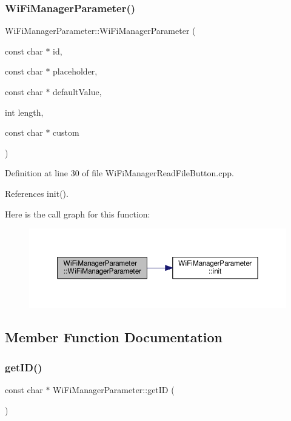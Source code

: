 \subsubsection{\texorpdfstring{Wi\+Fi\+Manager\+Parameter()}{WiFiManagerParameter()}\hspace{0.1cm}{\footnotesize\ttfamily [3/3]}}
{\footnotesize\ttfamily Wi\+Fi\+Manager\+Parameter\+::\+Wi\+Fi\+Manager\+Parameter (\begin{DoxyParamCaption}\item[{const char $\ast$}]{id,  }\item[{const char $\ast$}]{placeholder,  }\item[{const char $\ast$}]{default\+Value,  }\item[{int}]{length,  }\item[{const char $\ast$}]{custom }\end{DoxyParamCaption})}



Definition at line 30 of file Wi\+Fi\+Manager\+Read\+File\+Button.\+cpp.



References init().

Here is the call graph for this function\+:\nopagebreak
\begin{figure}[H]
\begin{center}
\leavevmode
\includegraphics[width=350pt]{d7/d08/class_wi_fi_manager_parameter_a45967e1d29d52f5fc8e47e99cb693b98_cgraph}
\end{center}
\end{figure}


\subsection{Member Function Documentation}
\mbox{\label{class_wi_fi_manager_parameter_af57919615418fff788310ba9cc2664d8}} 
\subsubsection{\texorpdfstring{get\+I\+D()}{getID()}}
{\footnotesize\ttfamily const char $\ast$ Wi\+Fi\+Manager\+Parameter\+::get\+ID (\begin{DoxyParamCaption}{ }\end{DoxyParamCaption})}



